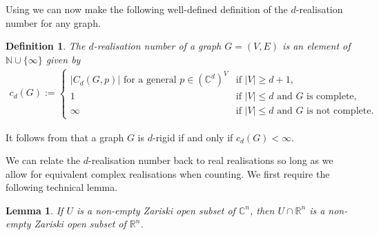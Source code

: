 \documentclass[11pt]{article}
\newtheorem{definition}[theo]{Definition}
\newtheorem{lemma}[theo]{Lemma}
\theoremstyle{definition}
\numberwithin{equation}{section}
\begin{document}
Using  we can now make the following well-defined definition of the $d$-realisation number for any graph.

\begin{definition}\label{def:count}
	The \emph{$d$-realisation number} of a graph $G=(V,E)$ is an element of $\mathbb{N} \cup \{\infty\}$ given by
	\begin{align*}
		c_d(G) :=		
		\begin{cases}
			|C_d(G,p)| \text{ for a general $p \in (\mathbb{C}^d)^V$} &\text{if } |V| \geq d+1, \\
			 1 &\text{if } |V| \leq d \text{ and $G$ is complete}, \\
			 \infty &\text{if } |V| \leq d \text{ and $G$ is not complete}.
		\end{cases}
	\end{align*}
\end{definition}

It follows from  that a graph $G$ is $d$-rigid if and only if $c_d(G) < \infty$.

We can relate the $d$-realisation number back to real realisations so long as we allow for equivalent complex realisations when counting.
We first require the following technical lemma.

\begin{lemma}\label{l:realzar}
	If $U$ is a non-empty Zariski open subset of $\mathbb{C}^n$, then $U \cap \mathbb{R}^n$ is a non-empty Zariski open subset of $\mathbb{R}^n$.
\end{lemma}
\end{document}
